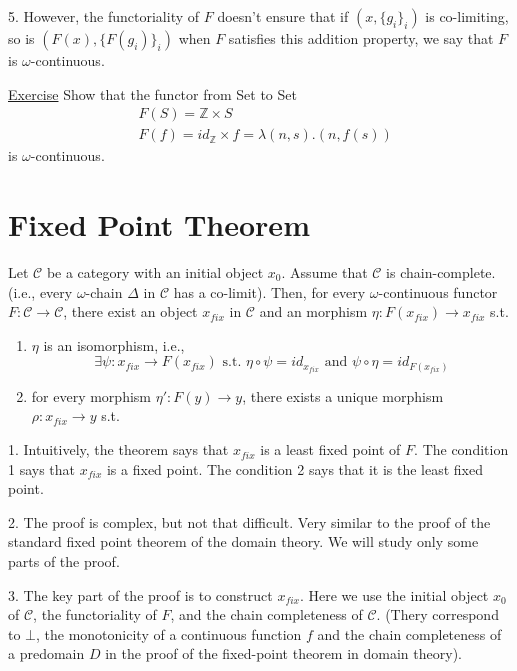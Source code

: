 \documentclass{report}[12pt]
\begin{document}
5. However, the functoriality of $F$ doesn't ensure that if $(x, \{g_i\}_i)$ is co-limiting, so is $(F(x), \{F(g_i)\}_i)$ when $F$ satisfies this addition property, we say that $F$ is $\omega$-continuous.

\underline{Exercise} Show that the functor from Set to Set
\begin{align*}
  &F(S) = \mathbb{Z}\times S \\
  &F(f) = id_{\mathbb{Z}} \times f = \lambda (n, s). (n, f(s))
\end{align*}
is $\omega$-continuous.

\section{Fixed Point Theorem}
\begin{theorem}
  Let $\mathcal{C}$ be a category with an initial object $x_0$. Assume that $\mathcal{C}$ is chain-complete. (i.e., every $\omega$-chain $\Delta$ in $\mathcal{C}$ has a co-limit). Then, for every $\omega$-continuous functor $F:\mathcal{C} \rightarrow\mathcal{C}$, there exist an object $x_{fix}$ in $\mathcal{C}$ and an morphism $\eta:F(x_{fix}) \rightarrow x_{fix}$ s.t.
  \begin{enumerate}
    \item $\eta$ is an isomorphism, i.e.,
    \[\exists \psi:x_{fix} \rightarrow F(x_{fix}) \text{ s.t. }\eta \circ \psi  = id_{x_{fix}} \text{ and }\psi \circ \eta = id_{F(x_{fix})}\]
    \item for every morphism $\eta':F(y) \rightarrow y$, there exists a unique morphism $\rho : x_{fix} \rightarrow y$ s.t.
    {\center
{}
    \par}
  \end{enumerate}
\end{theorem}
1. Intuitively, the theorem says that $x_{fix}$ is a least fixed point of $F$. The condition 1 says that $x_{fix}$ is a fixed point. The condition 2 says that it is the least fixed point.

2. The proof is complex, but not that difficult. Very similar to the proof of the standard fixed point theorem of the domain theory. We will study only some parts of the proof.

3. The key part of the proof is to construct $x_{fix}$. Here we use the initial object $x_0$ of $\mathcal{C}$, the functoriality of $F$, and the chain completeness of $\mathcal{C}$. (Thery correspond to $\bot$, the monotonicity of a continuous function $f$ and the chain completeness of a predomain $D$ in the proof of the fixed-point theorem in domain theory).
\end{document}
